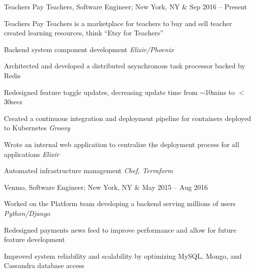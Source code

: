 \documentclass[letterpaper]{scrartcl}
\begin{document}
\begin{list1}

\item \begin{tabular1bold} Teachers Pay Teachers, Software Engineer; New York, NY & Sep 2016 -- Present \end{tabular1bold}

  \begin{list2}
  \item Teachers Pay Teachers is a marketplace for teachers to buy and sell teacher created learning resources, think ``Etsy for Teachers''

  \item Backend system component development \hfill\emph{Elixir/Phoenix}

    \begin{list3}
    \item Architected and developed a distributed asynchronous task processor backed by Redis
    \item Redesigned feature toggle updates, decreasing update time from $\sim$10mins to $<$30secs
    \end{list3}

  \item Created a continuous integration and deployment pipeline for containers deployed to Kubernetes \hfill\emph{Groovy}
  \item Wrote an internal web application to centralize the deployment process for all applications \hfill\emph{Elixir}
  \item Automated infrastructure management \hfill\emph{Chef, Terraform}
  \end{list2}

\item \begin{tabular1bold} Venmo, Software Engineer; New York, NY & May 2015 -- Aug 2016 \end{tabular1bold}

  \begin{list2}
  \item Worked on the Platform team developing a backend serving millions of users \hfill \emph{Python/Django}

    \begin{list3}
    \item Redesigned payments news feed to improve performance and allow for future feature development
    \item Improved system reliability and scalability by optimizing MySQL, Mongo, and Cassandra database access
    \end{list3}


\end{list2}
\end{list1}
\end{document}
